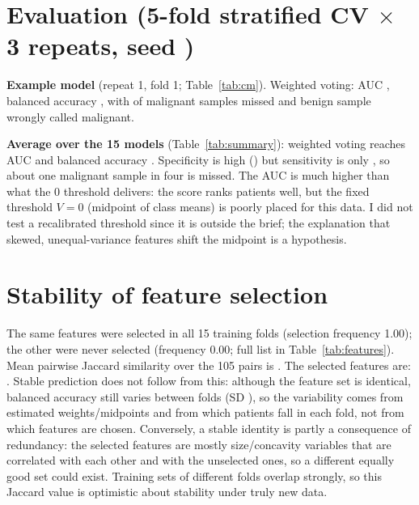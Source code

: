 \documentclass[10pt,a4paper]{article}
\begin{document}
\section{Evaluation (5-fold stratified CV $\times$ 3 repeats, seed \seed)}
\textbf{Example model} (repeat 1, fold 1; Table~\ref{tab:cm}). Weighted voting: AUC \exwvauc, balanced accuracy \exwvba, with
\exwvfn{} of \exwvmal{} malignant samples missed and \exwvfp{} benign sample wrongly called malignant.

\begin{table}[h]\centering\small

\caption{Confusion matrices of the example split (the same validation fold for both methods).}\label{tab:cm}
\end{table}

\textbf{Average over the 15 models} (Table~\ref{tab:summary}): weighted voting reaches AUC \wvauc{} and balanced accuracy
\wvba. Specificity is high (\wvspec) but sensitivity is only \wvsens, so about one malignant sample in four is missed. The AUC is much
higher than what the 0 threshold delivers: the score ranks patients well, but the fixed threshold $V=0$ (midpoint of class means)
is poorly placed for this data. I did not test a recalibrated threshold since it is outside the brief; the explanation that skewed,
unequal-variance features shift the midpoint is a hypothesis.

\begin{table}[h]\centering\small

\caption{Mean $\pm$ SD over the 15 validation folds (same splits for both methods).}\label{tab:summary}
\end{table}

\newpage

\section{Stability of feature selection}
The same \nalways{} features were selected in all 15 training folds (selection frequency 1.00); the other \nnever{} were never
selected (frequency 0.00; full list in Table~\ref{tab:features}). Mean pairwise Jaccard similarity over the 105 pairs is
\textbf{\jaccard}. The selected features are: \selfeatures. Stable prediction does not follow from this: although the feature set
is identical, balanced accuracy still varies between folds (SD \wvbasd), so the variability comes from estimated weights/midpoints
and from which patients fall in each fold, not from which features are chosen. Conversely, a stable identity is partly a consequence
of redundancy: the selected features are mostly size/concavity variables that are correlated with each other and with the unselected
ones, so a different equally good set could exist. Training sets of different folds overlap strongly, so this Jaccard value is
optimistic about stability under truly new data.
\end{document}
